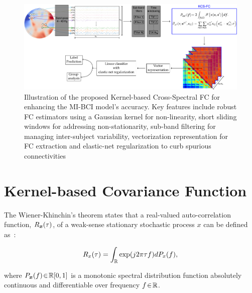 \begin{figure}[!h]
    \centering
    \includegraphics[scale=0.6]{Figures/outline_and_contributions/contribution1_B.pdf}
    \caption{Illustration of the proposed Kernel-based Cross-Spectral FC for enhancing the MI-BCI model's accuracy. Key features include robust FC estimators using a Gaussian kernel for non-linearity, short sliding windows for addressing non-stationarity, sub-band filtering for managing inter-subject variability, vectorization representation for FC extraction and elastic-net regularization to curb spurious connectivities \label{fig:contribution1}}
\end{figure}

\section{Kernel-based Covariance Function}
The Wiener-Khinchin's theorem states that a real-valued auto-correlation function, $R_{\bm {x}}(\tau)$, of a weak-sense stationary stochastic process $x$ can be defined as~\cite{cohen1998generalization}:

\begin{linenomath*}
	\begin{equation}\label{eq:wiener}
		R_{x}(\tau) = \int_{\mathbb{R}}\exp({j2\pi \tau f})dP_{{x}}(f),
	\end{equation}
\end{linenomath*}

where $P_{\bm {x}}(f)\negthinspace\in\negthinspace\mathbb{R}[0,1]$ is a monotonic spectral distribution function absolutely continuous and differentiable over frequency $f\negthinspace\in\negthinspace \mathbb{R}$.

